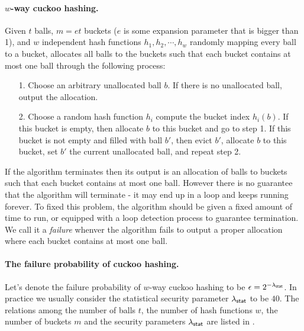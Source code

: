 \paragraph{$w$-way cuckoo hashing.}Given $t$ balls, $m=et$ buckets ($e$ is some expansion parameter that is bigger than 1), and $w$ independent hash functions $h_1, h_2,\cdots, h_w$ randomly mapping every ball to a bucket, allocates all balls to the buckets such that each bucket contains at most one ball through the following process: 
\begin{itemize}
  \item[1.] Choose an arbitrary unallocated ball $b$. If there is no unallocated ball, output the allocation. 
  \item[2.] Choose a random hash function $h_i$ compute the bucket index $h_i(b)$. If this bucket is empty, then allocate $b$ to this bucket and go to step 1. If this bucket is not empty and filled with ball $b'$, then evict $b'$, allocate $b$ to this bucket, set $b'$ the current unallocated ball, and repeat step 2. 
\end{itemize}
If the algorithm terminates then its output is an allocation of balls to buckets such that each bucket contains at most one ball. However there is no guarantee that the algorithm will terminate - it may end up in a loop and keeps running forever. To fixed this problem, the algorithm should be given a fixed amount of time to run, or equipped with a loop detection process to guarantee termination. We call it a \emph{failure} whenver the algorithm fails to output a proper allocation where each bucket contains at most one ball. 

\paragraph{The failure probability of cuckoo hashing.}Let's denote the failure probability of $w$-way cuckoo hashing to be $\epsilon=2^{-\lambda_{{\sf stat}}}$. In practice we usually consider the statistical security parameter $\lambda_{{\sf stat}}$ to be $40$. The relations among the number of balls $t$, the number of hash functions $w$, the number of buckets $m$ and the security parameters $\lambda_{\sf stat}$ are listed in . 

